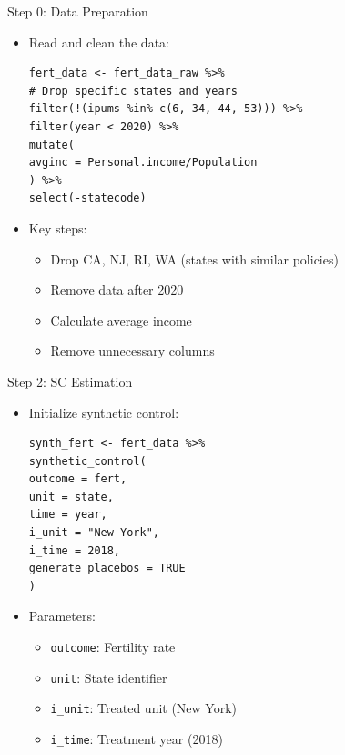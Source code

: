 \documentclass[dvipsnames,hyperref={pdfpagelabels=false}]{beamer}
\begin{document}
\begin{frame}[fragile]{Step 0: Data Preparation}
\begin{itemize}
\item Read and clean the data:
\vspace{0.2cm}
\begin{lstlisting}
fert_data <- fert_data_raw %>%
# Drop specific states and years
filter(!(ipums %in% c(6, 34, 44, 53))) %>%  
filter(year < 2020) %>%
mutate(
avginc = Personal.income/Population
) %>%
select(-statecode)
\end{lstlisting}
\vspace{0.2cm}
\item Key steps:
\begin{itemize}
	\item Drop CA, NJ, RI, WA (states with similar policies)
	\item Remove data after 2020
	\item Calculate average income
	\item Remove unnecessary columns
\end{itemize}
\end{itemize}
\end{frame}

\begin{frame}[fragile]{Step 2: SC Estimation}
\begin{itemize}
\item Initialize synthetic control:
\vspace{0.2cm}
\begin{lstlisting}
synth_fert <- fert_data %>%
synthetic_control(
outcome = fert,
unit = state,
time = year,
i_unit = "New York",
i_time = 2018,
generate_placebos = TRUE
)
\end{lstlisting}
\vspace{0.2cm}
\item Parameters:
\begin{itemize}
\item \texttt{outcome}: Fertility rate
\item \texttt{unit}: State identifier
\item \texttt{i\_unit}: Treated unit (New York)
\item \texttt{i\_time}: Treatment year (2018)
\end{itemize}
\end{itemize}
\end{frame}
\end{document}
